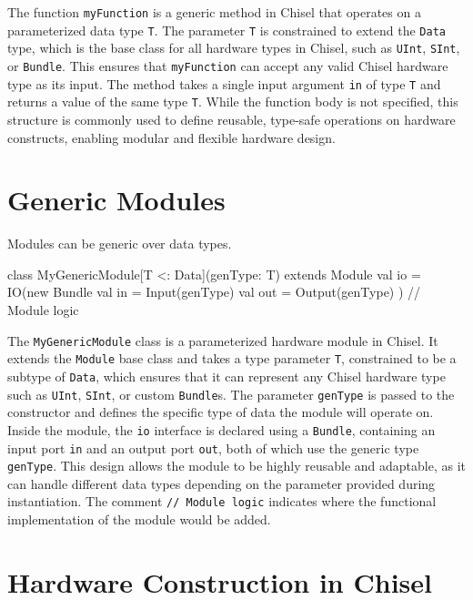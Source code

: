 The function \texttt{myFunction} is a generic method in Chisel that operates on a parameterized data type \texttt{T}. The parameter \texttt{T} is constrained to extend the \texttt{Data} type, which is the base class for all hardware types in Chisel, such as \texttt{UInt}, \texttt{SInt}, or \texttt{Bundle}. This ensures that \texttt{myFunction} can accept any valid Chisel hardware type as its input. The method takes a single input argument \texttt{in} of type \texttt{T} and returns a value of the same type \texttt{T}. While the function body is not specified, this structure is commonly used to define reusable, type-safe operations on hardware constructs, enabling modular and flexible hardware design.

\section{Generic Modules}
Modules can be generic over data types.
\begin{chiselcode}
class MyGenericModule[T <: Data](genType: T) extends Module {
  val io = IO(new Bundle {
    val in  = Input(genType)
    val out = Output(genType)
  })
  // Module logic
}
\end{chiselcode}

The \texttt{MyGenericModule} class is a parameterized hardware module in Chisel. It extends the \texttt{Module} base class and takes a type parameter \texttt{T}, constrained to be a subtype of \texttt{Data}, which ensures that it can represent any Chisel hardware type such as \texttt{UInt}, \texttt{SInt}, or custom \texttt{Bundle}s. The parameter \texttt{genType} is passed to the constructor and defines the specific type of data the module will operate on. Inside the module, the \texttt{io} interface is declared using a \texttt{Bundle}, containing an input port \texttt{in} and an output port \texttt{out}, both of which use the generic type \texttt{genType}. This design allows the module to be highly reusable and adaptable, as it can handle different data types depending on the parameter provided during instantiation. The comment \texttt{// Module logic} indicates where the functional implementation of the module would be added.


\section{Hardware Construction in Chisel}

